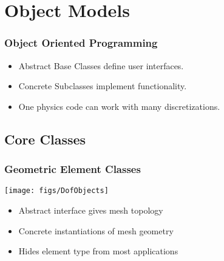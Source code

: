 
\section{Object Models}
      
\begin{frame}[<+->]
\frametitle{Object Oriented Programming}

  \begin{block}{}
  \begin{itemize}
    \item{Abstract Base Classes define user interfaces.}
    \item{Concrete Subclasses implement functionality.}
    \item{One physics code can work with many discretizations.}
  \end{itemize}
  \end{block}
\end{frame}

\subsection{Core Classes}

\begin{frame}
\frametitle{Geometric Element Classes}

\begin{minipage}[h]{.45\textwidth}
\begin{center}
\texttt{[image: figs/DofObjects]}
\end{center}
\end{minipage}
\begin{minipage}[h]{.45\textwidth}
\begin{block}{}
\begin{itemize}
\item Abstract interface gives mesh topology
\item Concrete instantiations of mesh geometry
\item Hides element type from most applications
\end{itemize}
\end{block}
\end{minipage}

\end{frame}

